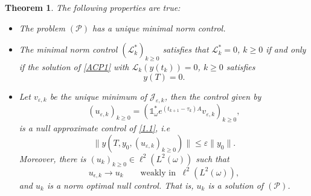 \documentclass[sn-mathphys]{sn-jnl}
\newtheorem{theorem}{Theorem}[section]
\begin{document}
\begin{theorem}
The following properties are true:
    \begin{itemize}
        \item [i)] The problem $(\mathcal{P})$ has a unique minimal norm control.
        \item [ii)] The minimal norm control $(\mathcal{L}_{k}^*)_{k\geq 0}$ satisfies that $\mathcal{L}_{k}^*=0$, $k\geq 0$ if and only if the solution of \eqref{ACP1} with $\mathcal{L}_{k}(y(t_k))=0$, $k\geq 0$ satisfies \[y(T)=0.\]
        \item [iii)] Let $v_{\varepsilon,k}$ be the unique minimum of \(\mathcal{J}_{\varepsilon,k}\), then the control given by
        \begin{equation}\label{normop}
            (u_{\varepsilon,k})_{k \geq 0}= \left( \mathds{1}_{\omega}^{*} e^{(t_{k+1}-\tau_k)A} v_{\varepsilon,k}\right)_{k \geq 0},
        \end{equation}
        is a null approximate control of \eqref{1.1}, i.e
        \[\|y(T,y_0,(u_{\varepsilon,k})_{k \geq 0}) \| \leq \varepsilon\|y_0\|.\]
        Moreover, there is $(u_k)_{k \geq 0} \in \ell^2(L^2(\omega))$ such that 
        \[ u_{\epsilon,k} \to u_k \qquad \text{weakly in} \;\; \ell^2(L^2(\omega)),\]
        and $u_k$ is a norm optimal null control. That is, $u_k$ is a solution of $(\mathcal{P})$.
    \end{itemize}
\end{theorem}
\end{document}
